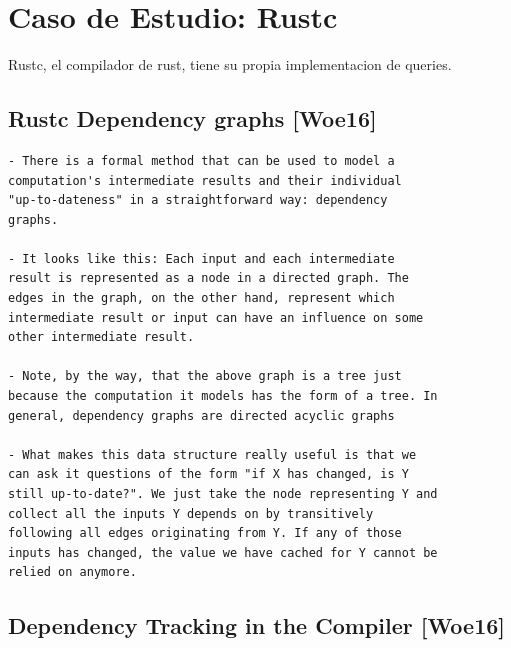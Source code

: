 \documentclass[12pt, a4paper]{report}
\begin{document}
\chapter*{Caso de Estudio: Rustc}

Rustc, el compilador de rust, tiene su propia implementacion de queries.

\section*{Rustc Dependency graphs [Woe16]}

\begin{verbatim}
- There is a formal method that can be used to model a
computation's intermediate results and their individual
"up-to-dateness" in a straightforward way: dependency
graphs.

- It looks like this: Each input and each intermediate
result is represented as a node in a directed graph. The
edges in the graph, on the other hand, represent which
intermediate result or input can have an influence on some
other intermediate result.

- Note, by the way, that the above graph is a tree just
because the computation it models has the form of a tree. In
general, dependency graphs are directed acyclic graphs

- What makes this data structure really useful is that we
can ask it questions of the form "if X has changed, is Y
still up-to-date?". We just take the node representing Y and
collect all the inputs Y depends on by transitively
following all edges originating from Y. If any of those
inputs has changed, the value we have cached for Y cannot be
relied on anymore.
\end{verbatim}
\cite{rust_blog_incremental_compilation}

\section*{Dependency Tracking in the Compiler [Woe16]}
\end{document}
